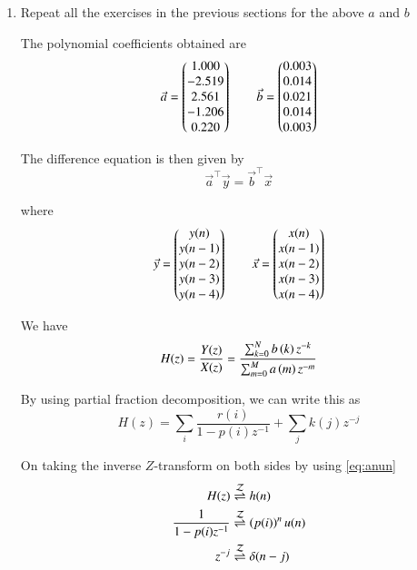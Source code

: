 \documentclass[journal,12pt,twocolumn]{IEEEtran}
\renewcommand\thesection{\arabic{section}}
\begin{document}
\begin{enumerate}[label=\thesection.\arabic*]
          \item Repeat all the exercises in the previous sections for the above $a$ and $b$

               \solution The polynomial coefficients obtained are
               \begin{align}
                    \vec{a} = \begin{pmatrix}1.000 \\ -2.519 \\ 2.561 \\ -1.206 \\ 0.220\end{pmatrix} \qquad
                    \vec{b} = \begin{pmatrix}0.003 \\ 0.014 \\ 0.021 \\ 0.014 \\ 0.003\end{pmatrix}
               \end{align}

               The difference equation is then given by
               \begin{equation}
                    \vec{a}^\top \vec{y} = \vec{b}^\top \vec{x}
               \end{equation}

               where
               \begin{align}
                    \vec{y} = \begin{pmatrix}y(n) \\ y(n-1) \\ y(n-2) \\ y(n-3) \\ y(n-4)\end{pmatrix} \qquad
                    \vec{x} = \begin{pmatrix}x(n) \\ x(n-1) \\ x(n-2) \\ x(n-3) \\ x(n-4)\end{pmatrix}
               \end{align}

               We have
               \begin{equation}
                    H(z) = \frac{Y(z)}{X(z)} = \frac{\sum _{k=0}^{N}b\left(k\right) z^{-k}}{\sum _{m=0}^{M}a\left(m\right) z^{-m}}
               \end{equation}

               By using partial fraction decomposition, we can write this as
               \begin{equation}
                    H(z) = \sum_i \frac{r(i)}{1-p(i)z^{-1}} + \sum_j k(j)z^{-j}
               \end{equation}

               On taking the inverse $Z$-transform on both sides by using \eqref{eq:anun}
               \begin{align}
                    H(z)                   & \overset{\mathcal{Z}}{ \rightleftharpoons} h(n)              \\
                    \frac{1}{1-p(i)z^{-1}} & \overset{\mathcal{Z}}{ \rightleftharpoons} \left(p(i)\right)^nu(n) \\
                    z^{-j}                 & \overset{\mathcal{Z}}{ \rightleftharpoons} \delta(n-j)
               \end{align}


\end{enumerate}
\end{document}
